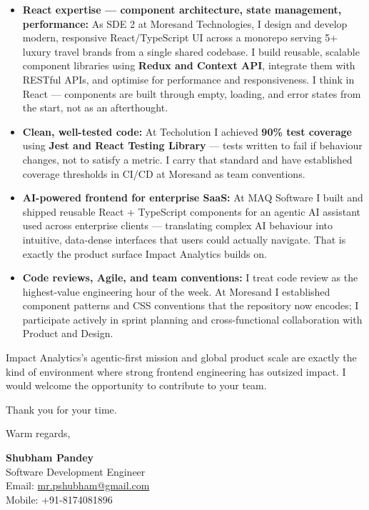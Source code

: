 \documentclass[a4paper,10pt]{article}
\begin{document}
\begin{itemize}[leftmargin=12pt, itemsep=3pt, parsep=0pt]
  \item \textbf{React expertise — component architecture, state management, performance:} As SDE 2 at Moresand Technologies, I design and develop modern, responsive React/TypeScript UI across a monorepo serving 5+ luxury travel brands from a single shared codebase. I build reusable, scalable component libraries using \textbf{Redux and Context API}, integrate them with RESTful APIs, and optimise for performance and responsiveness. I think in React — components are built through empty, loading, and error states from the start, not as an afterthought.

  \item \textbf{Clean, well-tested code:} At Techolution I achieved \textbf{90\% test coverage} using \textbf{Jest and React Testing Library} — tests written to fail if behaviour changes, not to satisfy a metric. I carry that standard and have established coverage thresholds in CI/CD at Moresand as team conventions.

  \item \textbf{AI-powered frontend for enterprise SaaS:} At MAQ Software I built and shipped reusable React + TypeScript components for an agentic AI assistant used across enterprise clients — translating complex AI behaviour into intuitive, data-dense interfaces that users could actually navigate. That is exactly the product surface Impact Analytics builds on.

  \item \textbf{Code reviews, Agile, and team conventions:} I treat code review as the highest-value engineering hour of the week. At Moresand I established component patterns and CSS conventions that the repository now encodes; I participate actively in sprint planning and cross-functional collaboration with Product and Design.
\end{itemize}

\vspace{6pt}
Impact Analytics's agentic-first mission and global product scale are exactly the kind of environment where strong frontend engineering has outsized impact. I would welcome the opportunity to contribute to your team.

\vspace{12pt}
Thank you for your time.

\vspace{8pt}
Warm regards,

\vspace{6pt}
\textbf{Shubham Pandey} \\
Software Development Engineer \\
Email: \href{mailto:mr.pshubham@gmail.com}{mr.pshubham@gmail.com} \\
Mobile: +91-8174081896
\end{document}

